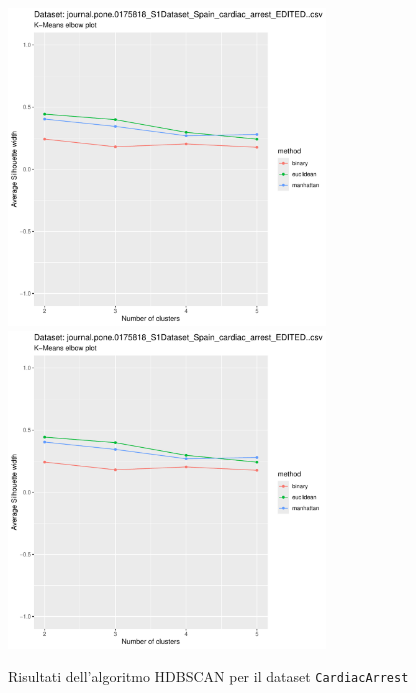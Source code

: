 \documentclass[a4paper, 12pt]{report}
\begin{document}
			\begin{figure}[H]
				\centering
				\includegraphics[width = 0.75\textwidth, height = 0.45\textheight, page = 7]{
					results/results_CardiacArrest.csv.pdf
				}
				\includegraphics[width = 0.75\textwidth, height = 0.45\textheight, page = 8]{
					results/results_CardiacArrest.csv.pdf
				}
				\caption{Risultati dell'algoritmo HDBSCAN per il dataset
				\texttt{CardiacArrest}}
				\label{fig:hdbscan2}
			\end{figure}
\end{document}
